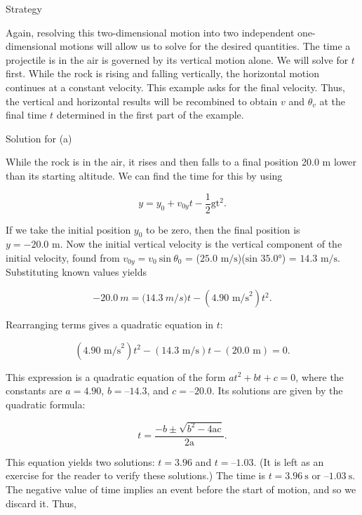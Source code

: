 \documentclass[
]{book}
\begin{document}
{Strategy}

Again, resolving this two-dimensional motion into two independent
one-dimensional motions will allow us to solve for the desired
quantities. The time a projectile is in the air is governed by its
vertical motion alone. We will solve for \(t{}\) first. While the rock is
rising and falling vertically, the horizontal motion continues at a
constant velocity. This example asks for the final velocity. Thus, the
vertical and horizontal results will be recombined to obtain \(v{}\) and
\(\theta_{v}{}\) at the final time \(t{}\) determined in the first part of
the example.

{Solution for (a)}

While the rock is in the air, it rises and then falls to a final
position 20.0 m lower than its starting altitude. We can find the time
for this by using

\leavevmode{}%
\[{{y = {y_{0} + v_{0y}}}{t - \frac{1}{2}}\text{gt}^{2}\text{.}}{}\]

If we take the initial position \(y_{0}{}\) to be zero, then the final
position is \({{y = {- \text{20}}}\text{.0\ \ m}\text{.}}{}\) Now the
initial vertical velocity is the vertical component of the initial
velocity, found from \({{v_{0y} = v_{0}}\ \text{sin}\ \theta_{0}}{}\) =
(\({\text{25}\text{.}\text{0~m/s}}{}\))(\(\text{sin\ 35.0°}{}\)) =
\({\text{14}\text{.}\text{3~m/s}}{}\). Substituting known values yields

\leavevmode{}%
\[{{{- \text{20}}\text{.}0\ m{= (}\text{14}\text{.}3\ m/s){t - \left( {4\text{.}\text{90\ m/s}^{2}} \right)}t^{2}}\text{.}}{}\]

Rearranging terms gives a quadratic equation in \(t{}\):

\leavevmode{}%
\[{\left( {4\text{.}\text{90\ m/s}^{2}} \right){t^{2} - \left( {\text{14}\text{.}\text{3\ m/s}} \right)}{{t - \left( \text{20.0\ m} \right)} = 0.}}{}\]

This expression is a quadratic equation of the form
\({at}^{2} + {bt} + c = 0\), where the constants are \(a = 4.90\),
\(b = –14.3\), and \(c = –20.0.\) Its solutions are given by the quadratic
formula:

\leavevmode{}%
\[{{t = \frac{{- b} \pm \sqrt{{b^{2} - 4}\text{ac}}}{\text{2}\text{a}}}\text{.}}{}\]

This equation yields two solutions: \(t = 3.96\) and \(t = –1.03\). (It is
left as an exercise for the reader to verify these solutions.) The time
is \(t = 3.96\ \text{s}\) or \(–1.03\ \text{s}\). The negative value of time
implies an event before the start of motion, and so we discard it. Thus,
\end{document}
